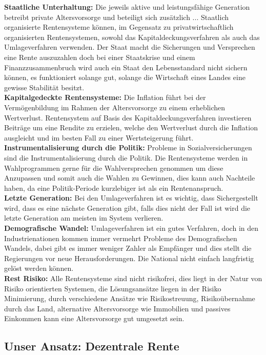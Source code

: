 \textbf{Staatliche Unterhaltung:} Die jeweils aktive und leistungsfähige Generation betreibt private Altersvorsorge und beteiligt sich zusätzlich ...
Staatlich organisierte Rentensysteme können, im Gegensatz zu privatwirtschaftlich organisierten Rentensystemen, sowohl das Kapitaldeckungsverfahren als auch das Umlageverfahren verwenden. 
Der Staat macht die Sicherungen und Versprechen eine Rente auszuzahlen doch bei einer Staatskrise und einem Finanzzusammenbruch wird auch ein Staat den Lebensstandard nicht sichern können, es funktioniert solange gut, solange die Wirtschaft eines Landes eine gewisse Stabilität besitzt.\\
\textbf{Kapitalgedeckte Rentensysteme:} Die Inflation führt bei der Vermögenbildung im Rahmen der Altersvorsorge zu einem erheblichen Wertverlust. 
Rentensystem auf Basis des Kapitaldeckungsverfahren investieren Beiträge um eine Rendite zu erzielen, welche den Wertverlust durch die Inflation ausgleicht und im besten Fall zu einer Wertsteigerung führt. \\
\textbf{Instrumentalisierung durch die Politik:} Probleme in Sozialversicherungen sind die Instrumentalisierung durch die Politik.
Die Rentensysteme werden in Wahlprogrammen gerne für die Wahlversprechen genommen um diese Anzupassen und somit auch die Wahlen zu Gewinnen, dies kann auch Nachteile haben, da eine Politik-Periode kurzlebiger ist als ein Rentenanspruch. \\
\textbf{Letzte Generation:} Bei den Umlageverfahren ist es wichtig, dass Sichergestellt wird, dass es eine nächste Generation gibt, falls dies nicht der Fall ist wird die letzte Generation am meisten im System verlieren.\\
\textbf{Demografische Wandel:} Umlageverfahren ist ein gutes Verfahren, doch in den Industrienationen kommen immer vermehrt Probleme des Demografischen Wandels, dabei gibt es immer weniger Zahler als Empfänger und dies stellt die Regierungen vor neue Herausforderungen. Die National nicht einfach langfristig gelöst werden können. \\
\textbf{Rest Risiko:} Alle Rentensysteme sind nicht risikofrei, dies liegt in der Natur von Risiko orientierten Systemen, die Lösungsansätze liegen in der Risiko Minimierung, durch verschiedene Ansätze wie Risikostreuung, Risikoübernahme durch das Land, alternative Altersvorsorge wie Immobilien und passives Einkommen kann eine Altersvorsorge gut umgesetzt sein.


\subsection{Unser Ansatz: Dezentrale Rente}

